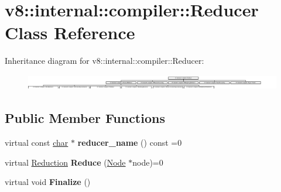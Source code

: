 \hypertarget{classv8_1_1internal_1_1compiler_1_1Reducer}{}\section{v8\+:\+:internal\+:\+:compiler\+:\+:Reducer Class Reference}
\label{classv8_1_1internal_1_1compiler_1_1Reducer}
Inheritance diagram for v8\+:\+:internal\+:\+:compiler\+:\+:Reducer\+:\begin{figure}[H]
\begin{center}
\leavevmode
\includegraphics[height=0.670927cm]{classv8_1_1internal_1_1compiler_1_1Reducer}
\end{center}
\end{figure}
\subsection*{Public Member Functions}
\begin{DoxyCompactItemize}
\item 
\mbox{\label{classv8_1_1internal_1_1compiler_1_1Reducer_accff4b2e327082a6d4b3ee6205286412}} 
virtual const \mbox{\hyperlink{classchar}{char}} $\ast$ {\bfseries reducer\+\_\+name} () const =0
\item 
\mbox{\label{classv8_1_1internal_1_1compiler_1_1Reducer_acc15b2ec184dc342fb3e7d77488952ff}} 
virtual \mbox{\hyperlink{classv8_1_1internal_1_1compiler_1_1Reduction}{Reduction}} {\bfseries Reduce} (\mbox{\hyperlink{classv8_1_1internal_1_1compiler_1_1Node}{Node}} $\ast$node)=0
\item 
\mbox{\label{classv8_1_1internal_1_1compiler_1_1Reducer_ac513c56f978be7f058b9894d24a0a3c7}} 
virtual void {\bfseries Finalize} ()
\end{DoxyCompactItemize}
